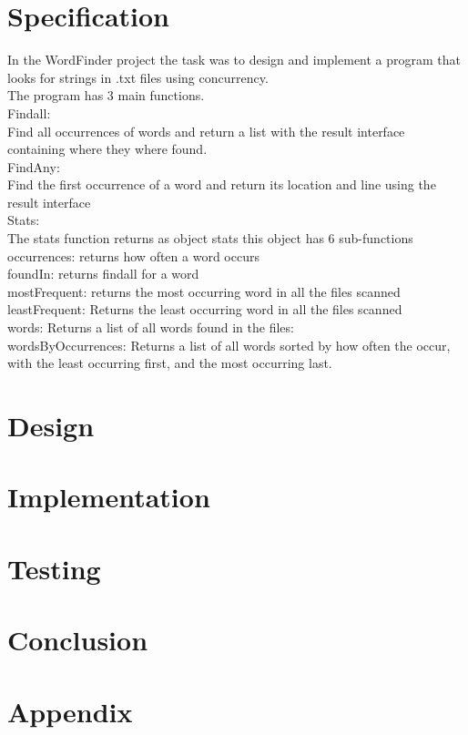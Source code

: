 \documentclass[a4paper,10pt,titlepage]{report}
\begin{document}
\section{Specification}
 In the WordFinder project the task was to design and implement a program that looks for strings in .txt files using concurrency. \\ 
  \vspace*{5mm}  
The program has 3 main functions. \\
Findall: \\
\hspace*{5mm}Find all occurrences of words and return a list with the result interface containing where they where found. \\
FindAny: \\
\hspace*{5mm}	Find the first occurrence of a word and return its location and line using the result interface \\
Stats: \\
\hspace*{5mm}	The stats function returns as object stats this object has 6 sub-functions \\
\hspace*{10mm}	occurrences:  returns how often a word occurs \\
\hspace*{10mm}	foundIn:  	returns findall for a word \\
\hspace*{10mm}	mostFrequent:  	returns the most occurring word in all the files scanned  \\
\hspace*{10mm}	leastFrequent: 	Returns the least occurring word in all the files scanned \\
\hspace*{10mm}	words: 	Returns a list of all words found in the files: \\
\hspace*{10mm}	wordsByOccurrences: Returns a list of all words sorted by how often the occur, with the least occurring first, and the most occurring last. \\
	


\section{Design}

\section{Implementation}

\section{Testing}

\section{Conclusion}

\section{Appendix}
\end{document}
